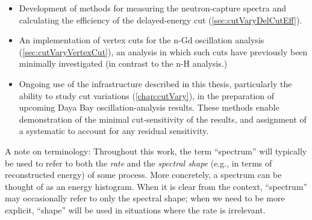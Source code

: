 \documentclass[../thesis.tex]{subfiles}
\begin{document}
\begin{itemize}
  \item Development of methods for measuring the neutron-capture spectra and calculating the efficiency of the delayed-energy cut (\autoref{sec:cutVaryDelCutEff}).
  \item An implementation of vertex cuts for the n-Gd oscillation analysis (\autoref{sec:cutVaryVertexCut}), an analysis in which such cuts have previously been minimally investigated (in contrast to the n-H analysis.)
  \item Ongoing use of the infrastructure described in this thesis, particularly the ability to study cut variations (\autoref{chap:cutVary}), in the preparation of upcoming Daya Bay oscillation-analysis results. These methods enable demonstration of the minimal cut-sensitivity of the results, and assignment of a systematic to account for any residual sensitivity.
\end{itemize}

A note on terminology: Throughout this work, the term ``spectrum'' will typically be used to refer to both the \emph{rate} and the \emph{spectral shape} (e.g., in terms of reconstructed energy) of some process. More concretely, a spectrum can be thought of as an energy histogram. When it is clear from the context, ``spectrum'' may occasionally refer to only the spectral shape; when we need to be more explicit, ``shape'' will be used in situations where the rate is irrelevant.
\end{document}
